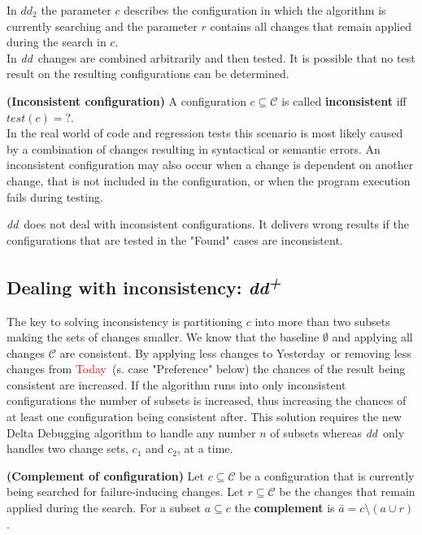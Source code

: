 \documentclass[a4paper,UKenglish]{lipics-v2018}
\newcommand{\dd}[0]{\textit{dd}}
\newcommand{\ddp}{\textit{dd\textsuperscript{+}}}
\newcommand{\green}[1]{\textcolor{td-green}{#1}}
\newcommand{\red}[1]{\textcolor{red}{#1}}
\newcommand{\yd}[0]{\green{Yesterday}}
\newcommand{\td}[0]{\red{Today}}
\newcommand{\C}[0]{\ensuremath{\mathcal{C}}}
\newcommand{\qmark}{\textbf{?}}
\newcommand{\defsub}[1]{\textbf{(#1)} }
\begin{document}
In $dd_2$ the parameter $c$ describes the configuration in which the algorithm is currently searching and the parameter $r$ contains all changes that remain applied during the search in $c$. \\

In \dd\ changes are combined arbitrarily and then tested. It is possible that no test result on the resulting configurations can be determined. 

 \defsub{Inconsistent configuration} A configuration $c \subseteq \C$ is called \textbf{inconsistent} iff $test(c) = \qmark$. \\

In the real world of code and regression tests this scenario is most likely caused by a combination of changes resulting in syntactical or semantic errors. An inconsistent configuration may also occur when a change is dependent on another change, that is not included in the configuration, or when the program execution fails during testing. 

\dd\ does not deal with inconsistent configurations. It delivers wrong results if the configurations that are tested in the "Found" cases are inconsistent.


\subsection{Dealing with inconsistency: \ddp}

The key to solving inconsistency is partitioning $c$ into more than two subsets making the sets of changes smaller. We know that the baseline $\emptyset$ and applying all changes $\C$ are consistent. By applying less changes to \yd\ or removing less changes from \td\ (s. case "Preference" below) the chances of the result being consistent are increased. If the algorithm runs into only inconsistent configurations the number of subsets is increased, thus increasing the chances of at least one configuration being consistent after. This solution requires the new Delta Debugging algorithm to handle any number $n$ of subsets whereas \dd\ only handles two change sets, $c_1$ and $c_2$, at a time.

 \defsub{Complement of configuration} Let $c \subseteq \C$ be a configuration that is currently being searched for failure-inducing changes. Let $r \subseteq \C$ be the changes that remain applied during the search. For a subset $a \subseteq c$ the \textbf{complement} is $\bar{a} = c \setminus (a \cup r)$.\\
\end{document}
